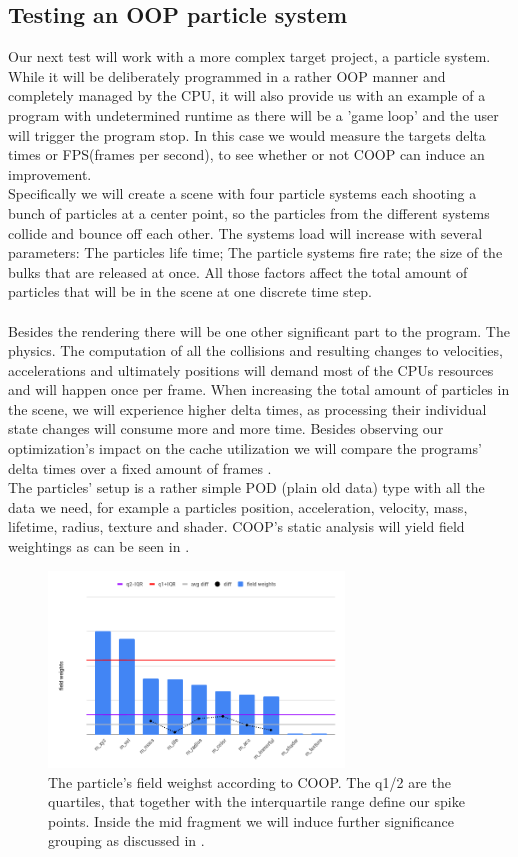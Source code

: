\subsection{Testing an OOP particle system}\label{testing_oop}
Our next test will work with a more complex target project, a particle system. While it will be deliberately programmed in a rather OOP manner and completely managed by the CPU, it will also provide us with an example of a program with undetermined runtime as there will be a 'game loop' and the user will trigger the program stop. In this case we would measure the targets delta times or FPS(frames per second), to see whether or not COOP can induce an improvement.\\
Specifically we will create a scene with four particle systems each shooting a bunch of particles at a center point, so the particles from the different systems collide and bounce off each other. The systems load will increase with several parameters: The particles life time; The particle systems fire rate; the size of the bulks that are released at once. All those factors affect the total amount of particles that will be in the scene at one discrete time step.\\\\
Besides the rendering there will be one other significant part to the program. The physics. The computation of all the collisions and resulting changes to velocities, accelerations and ultimately positions will demand most of the CPUs resources and will happen once per frame. When increasing the total amount of particles in the scene, we will experience higher delta times, as processing their individual state changes will consume more and more time. Besides observing our optimization's impact on the cache utilization we will compare the programs' delta times over a fixed amount of frames .\\
The particles' setup is a rather simple POD (plain old data) type with all the data we need, for example a particles position, acceleration, velocity, mass, lifetime, radius, texture and shader. COOP's static analysis will yield field weightings as can be seen in .
\begin{figure}[!htbp]
	\centering
	\includegraphics[width=0.7\textwidth,height=0.5\textwidth]{PICs/particle_field_weights}
	\caption{The particle's field weighst according to COOP. The q1/2 are the quartiles, that together with the interquartile range define our spike points. Inside the mid fragment we will induce further significance grouping as discussed in .}
	\label{particle_field_weights}
\end{figure}
